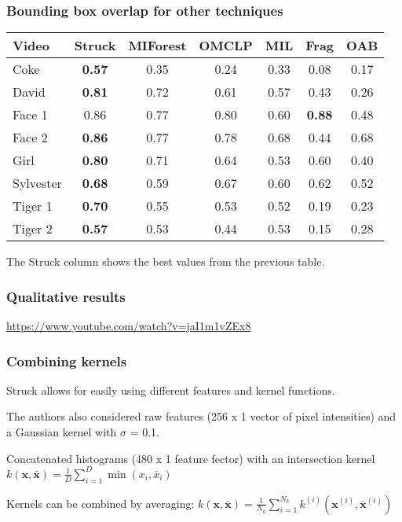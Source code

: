 \begin{frame}
    \frametitle{Bounding box overlap for other techniques}
    \begin{tabular}{l c c c c c c}
        \toprule
        Video & Struck & MIForest & OMCLP & MIL & Frag & OAB \\
        \midrule
        Coke      & \textbf{0.57} & 0.35 & 0.24 & 0.33 &         0.08  & 0.17 \\
        David     & \textbf{0.81} & 0.72 & 0.61 & 0.57 &         0.43  & 0.26 \\
        Face 1    &         0.86  & 0.77 & 0.80 & 0.60 & \textbf{0.88} & 0.48 \\
        Face 2    & \textbf{0.86} & 0.77 & 0.78 & 0.68 &         0.44  & 0.68 \\
        Girl      & \textbf{0.80} & 0.71 & 0.64 & 0.53 &         0.60  & 0.40 \\
        Sylvester & \textbf{0.68} & 0.59 & 0.67 & 0.60 &         0.62  & 0.52 \\
        Tiger 1   & \textbf{0.70} & 0.55 & 0.53 & 0.52 &         0.19  & 0.23 \\
        Tiger 2   & \textbf{0.57} & 0.53 & 0.44 & 0.53 &         0.15  & 0.28 \\
        \bottomrule
    \end{tabular}

    The Struck column shows the best values from the previous table.
\end{frame}

\begin{frame}
    \frametitle{Qualitative results}
    \url{https://www.youtube.com/watch?v=jaI1m1vZEx8}
\end{frame}

\begin{frame}
    \frametitle{Combining kernels}
    Struck allows for easily using different features and kernel functions.

    The authors also considered raw features (256 x 1 vector of pixel intensities) and a Gaussian
    kernel with \(\sigma\) = 0.1.

    Concatenated histograms (480 x 1 feature fector) with an intersection kernel \(k(\mathbf{x},
    \mathbf{\bar{x}}) = \frac{1}{D} \sum_{i=1}^D \min(x_i, \bar{x}_i)\)

    Kernels can be combined by averaging: \( k(\mathbf{x}, \mathbf{\bar{x}}) =
    \frac{1}{N_k} \sum_{i=1}^{N_k} k^{(i)} \left( \mathbf{x}^{(i)}, \mathbf{\bar{x}}^{(i)} \right) \)
\end{frame}


